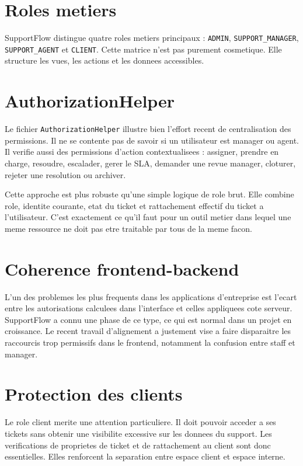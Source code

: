 \documentclass[12pt,a4paper,oneside]{report}
\begin{document}
\section{Roles metiers}

SupportFlow distingue quatre roles metiers principaux : \texttt{ADMIN}, \texttt{SUPPORT\_MANAGER}, \texttt{SUPPORT\_AGENT} et \texttt{CLIENT}. Cette matrice n'est pas purement cosmetique. Elle structure les vues, les actions et les donnees accessibles.

\section{AuthorizationHelper}

Le fichier \texttt{AuthorizationHelper} illustre bien l'effort recent de centralisation des permissions. Il ne se contente pas de savoir si un utilisateur est manager ou agent. Il verifie aussi des permissions d'action contextualisees : assigner, prendre en charge, resoudre, escalader, gerer le SLA, demander une revue manager, cloturer, rejeter une resolution ou archiver.

Cette approche est plus robuste qu'une simple logique de role brut. Elle combine role, identite courante, etat du ticket et rattachement effectif du ticket a l'utilisateur. C'est exactement ce qu'il faut pour un outil metier dans lequel une meme ressource ne doit pas etre traitable par tous de la meme facon.

\section{Coherence frontend-backend}

L'un des problemes les plus frequents dans les applications d'entreprise est l'ecart entre les autorisations calculees dans l'interface et celles appliquees cote serveur. SupportFlow a connu une phase de ce type, ce qui est normal dans un projet en croissance. Le recent travail d'alignement a justement vise a faire disparaitre les raccourcis trop permissifs dans le frontend, notamment la confusion entre staff et manager.

\section{Protection des clients}

Le role client merite une attention particuliere. Il doit pouvoir acceder a ses tickets sans obtenir une visibilite excessive sur les donnees du support. Les verifications de proprietes de ticket et de rattachement au client sont donc essentielles. Elles renforcent la separation entre espace client et espace interne.
\end{document}
